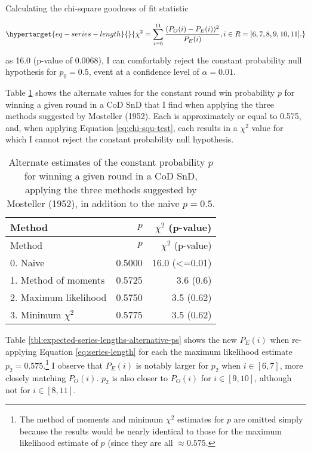 \documentclass{article}
\begin{document}
Calculating the chi-square goodness of fit statistic

\begin{equation}\protect\hypertarget{eq-series-length}{}{
\chi^2 = \sum^{11}_{i=6} \frac{(P_O(i) - P_E(i))^2}{P_E(i)}, i \in R = [6, 7, 8, 9, 10, 11].
}\label{eq:chi-squ-test}\end{equation}

as 16.0 (p-value of 0.0068), I can comfortably reject the constant
probability null hypothesis for \(p_0 = 0.5\), event at a confidence
level of \(\alpha = 0.01\).

Table \ref{tbl:mosteller-methods-results} shows the alternate values for
the constant round win probability \(p\) for winning a given round in a
CoD SnD that I find when applying the three methods suggested by
Mosteller (1952). Each is approximately or equal to 0.575, and, when
applying Equation \ref{eq:chi-squ-test}, each results in a \(\chi^2\)
value for which I cannot reject the constant probability null
hypothesis.

\begin{longtable}[]{@{}lrr@{}}
  \caption{Alternate estimates of the constant probability \(p\) for winning a given round in a CoD SnD, applying the three methods suggested by Mosteller (1952), in addition to the naive \(p = 0.5\).}\label{tbl:mosteller-methods-results} \\
  \toprule()
    Method & \(p\) & \(\chi^2\) (p-value) \\
    \midrule()
    \endfirsthead
    \toprule()
    Method & \(p\) & \(\chi^2\) (p-value) \\
    \midrule()
  \endhead
  0. Naive & 0.5000 & 16.0 (\textless=0.01) \\
  1. Method of moments & 0.5725 & 3.6 (0.6) \\
  2. Maximum likelihood & 0.5750 & 3.5 (0.62) \\
  3. Minimum \(\chi^2\) & 0.5775 & 3.5 (0.62) \\
  \bottomrule()
\end{longtable}

Table \ref{tbl:expected-series-lengths-alternative-ps} shows the new
\(P_E(i)\) when re-applying Equation \ref{eq:series-length} for each the
maximum likelihood estimate \(p_2 = 0.575\).\footnote{The method of
  moments and minimum \(\chi^2\) estimates for \(p\) are omitted simply
  because the results would be nearly identical to those for the maximum
  likelihood estimate of \(p\) (since they are all \(\approx 0.575\).} I
observe that \(P_E(i)\) is notably larger for \(p_{2}\) when
\(i \in [6, 7]\), more closely matching \(P_O(i)\). \(p_{2}\) is also
closer to \(P_O(i)\) for \(i \in [9, 10]\), although not for
\(i \in [8, 11]\).
\end{document}
